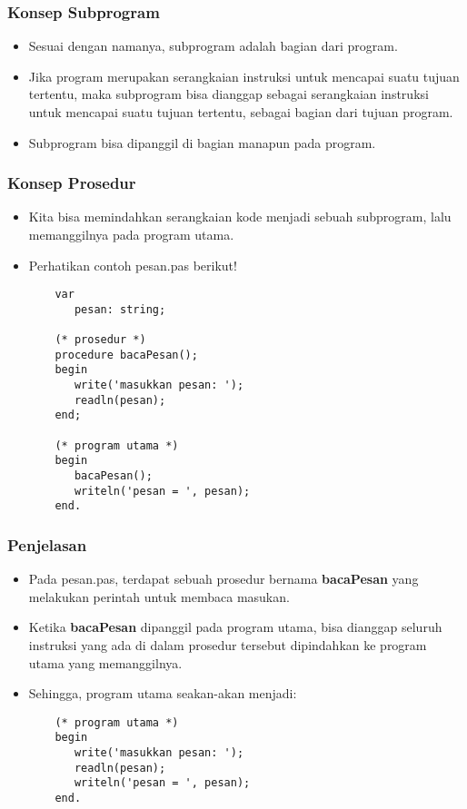 \documentclass{beamer}
\begin{document}
\begin{frame}
\frametitle{Konsep Subprogram}
\begin{itemize}
	\item Sesuai dengan namanya, subprogram adalah bagian dari program.
	\item Jika program merupakan serangkaian instruksi untuk mencapai suatu tujuan tertentu, maka subprogram bisa dianggap sebagai serangkaian instruksi untuk mencapai suatu tujuan tertentu, \alert{sebagai bagian dari tujuan program}.
	\item Subprogram bisa dipanggil di bagian manapun pada program.
\end{itemize}
\end{frame}

\begin{frame}[fragile]
\frametitle{Konsep Prosedur}
\begin{itemize}
	\item Kita bisa memindahkan serangkaian kode menjadi sebuah subprogram, lalu memanggilnya pada program utama.
	\item Perhatikan contoh pesan.pas berikut!
	\begin{lstlisting}
	var
	   pesan: string;
	
	(* prosedur *)
	procedure bacaPesan();
	begin
	   write('masukkan pesan: ');
	   readln(pesan);
	end;
	
	(* program utama *)
	begin
	   bacaPesan();
	   writeln('pesan = ', pesan);
	end.
	\end{lstlisting}
\end{itemize}
\end{frame}

\begin{frame}[fragile]
\frametitle{Penjelasan}
\begin{itemize}
	\item Pada pesan.pas, terdapat sebuah prosedur bernama \textbf{bacaPesan} yang melakukan perintah untuk membaca masukan.
	\item Ketika \textbf{bacaPesan} dipanggil pada program utama, bisa dianggap seluruh instruksi yang ada di dalam prosedur tersebut dipindahkan ke program utama yang memanggilnya.
	\item Sehingga, program utama seakan-akan menjadi:
	\begin{lstlisting}
	(* program utama *)
	begin
	   write('masukkan pesan: ');
	   readln(pesan);
	   writeln('pesan = ', pesan);
	end.
	\end{lstlisting}
\end{itemize}
\end{frame}
\end{document}
